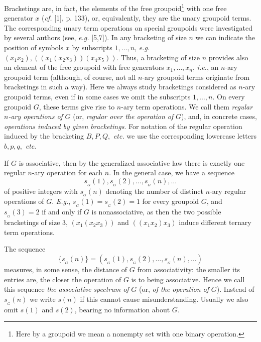 \documentclass[a4paper,reqno]{amsart}\usepackage{amssymb,latexsym}
\theoremstyle{definition}
\theoremstyle{remark}
\numberwithin{equation}{section}
\numberwithin{theorem}{section}
\begin{document}
Bracketings are, in fact, the elements of the free groupoid\footnote{{Here by
a groupoid we mean a nonempty set with one binary operation.}} with one free
generator $x$ (\textit{cf.} [1], p. 133), or, equivalently, they are the unary
groupoid terms. The corresponding unary term operations on special groupoids
were investigated by several authors (see, \textit{e.g.} [5,7]). In any
bracketing of size $n$ we can indicate the position of symbols $x$ by
subscripts $1,\ldots,n$, \textit{e.g.} $(x_{1}x_{2}),((x_{1}(x_{2}x_{3}))(x_{4}x_{5}))$. Thus, a bracketing of size $n$ provides also an element
of the free groupoid with free generators $x_{1},\ldots,x_{n}$, \textit{i.e.},
an $n$-ary groupoid term (although, of course, not all $n$-ary groupoid terms
originate from bracketings in such a way). Here we always study bracketings
considered as $n$-ary groupoid terms, even if in some cases we omit the
subscripts $1,\ldots,n$. On every groupoid $G$, these terms give rise to
$n$-ary term operations. We call them \textit{regular} $n$\textit{-ary
operations of} $G$ (or, \textit{regular over the operation of} $G$), and, in
concrete cases, \textit{operations induced by given bracketings}. For notation
of the regular operation induced by the bracketing $B,P,Q,$ \textit{etc.} we
use the corresponding lowercase letters $b,p,q,$ \textit{etc}.

If $G$ is associative, then by the generalized associative law there is
exactly one regular $n$-ary operation for each $n$. In the general case, we
have a sequence
\[
{s_{{}_{G}}}(1),{s_{{}_{G}}}(2),\ldots,{s_{{}_{G}}}(n),\ldots
\]
of positive integers with $s_{{}_{G}}(n)$ denoting the number of distinct
$n$-ary regular operations of $G$. \textit{E.g.}, $s_{{}_{G}}(1)=s_{{}_{G}}(2)=1 $ for every groupoid $G$, and $s_{{}_{G}}(3)=2$ if and only if $G$ is
nonassociative, as then the two possible bracketings of size 3, $(x_{1}(x_{2}x_{3}))$ and $((x_{1}x_{2})x_{3})$ induce different ternary term operations.

The sequence
\[
\{s_{{}_{G}}(n)\}=(s_{{}_{G}}(1),s_{{}_{G}}(2),\ldots,s_{{}_{G}}(n),\ldots)
\]
measures, in some sense, the distance of $G$ from associativity: the smaller
its entries are, the closer the operation of $G$ is to being associative.
Hence we call this sequence \textit{the associative spectrum of} $G$ (or,
\textit{of the operation of} $G$). Instead of $s_{{}_{G}}(n)$ we write $s(n)$
if this cannot cause misunderstanding. Usually we also omit $s(1)$ and $s(2)$,
bearing no information about $G$.
\end{document}
